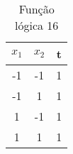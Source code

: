 \begin{table}[H]
\centering
\begin{tabular}{|c|c|c|}
\hline
 $x_1$ & $x_2$ & t\\ \hline
 -1 & -1 & 1\\ \hline
 -1 & 1 & 1\\ \hline
 1 & -1 & 1\\ \hline
 1 & 1 & 1\\ \hline
\end{tabular}
\caption{Função lógica 16}\label{tab:16}\end{table}

